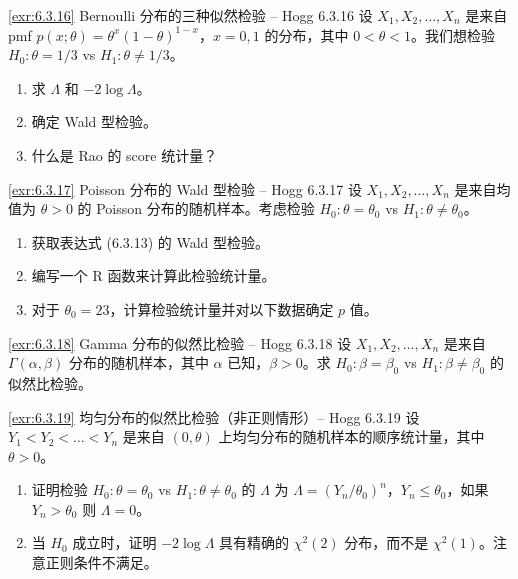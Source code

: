 \begin{exercise}{\ref{exr:6.3.16} Bernoulli 分布的三种似然检验 – Hogg 6.3.16}\label{exr:6.3.16}
设 $X_1, X_2, \ldots, X_n$ 是来自 pmf $p(x;\theta) = \theta^x(1-\theta)^{1-x}$，$x=0,1$ 的分布，其中 $0 < \theta < 1$。我们想检验 $H_0: \theta=1/3$ vs $H_1: \theta \neq 1/3$。

\begin{enumerate}
\item[(a)] 求 $\Lambda$ 和 $-2\log\Lambda$。
\item[(b)] 确定 Wald 型检验。
\item[(c)] 什么是 Rao 的 score 统计量？
\end{enumerate}
\end{exercise}

\begin{exercise}{\ref{exr:6.3.17} Poisson 分布的 Wald 型检验 – Hogg 6.3.17}\label{exr:6.3.17}
设 $X_1, X_2, \ldots, X_n$ 是来自均值为 $\theta > 0$ 的 Poisson 分布的随机样本。考虑检验 $H_0: \theta=\theta_0$ vs $H_1: \theta \neq \theta_0$。

\begin{enumerate}
\item[(a)] 获取表达式 (6.3.13) 的 Wald 型检验。
\item[(b)] 编写一个 R 函数来计算此检验统计量。
\item[(c)] 对于 $\theta_0=23$，计算检验统计量并对以下数据确定 $p$ 值。
\end{enumerate}
\end{exercise}

\begin{exercise}{\ref{exr:6.3.18} Gamma 分布的似然比检验 – Hogg 6.3.18}\label{exr:6.3.18}
设 $X_1, X_2, \ldots, X_n$ 是来自 $\Gamma(\alpha,\beta)$ 分布的随机样本，其中 $\alpha$ 已知，$\beta > 0$。求 $H_0: \beta=\beta_0$ vs $H_1: \beta \neq \beta_0$ 的似然比检验。
\end{exercise}

\begin{exercise}{\ref{exr:6.3.19} 均匀分布的似然比检验（非正则情形）– Hogg 6.3.19}\label{exr:6.3.19}
设 $Y_1 < Y_2 < \ldots < Y_n$ 是来自 $(0,\theta)$ 上均匀分布的随机样本的顺序统计量，其中 $\theta > 0$。

\begin{enumerate}
\item[(a)] 证明检验 $H_0: \theta=\theta_0$ vs $H_1: \theta \neq \theta_0$ 的 $\Lambda$ 为 $\Lambda = (Y_n/\theta_0)^n$，$Y_n \leq \theta_0$，如果 $Y_n > \theta_0$ 则 $\Lambda=0$。
\item[(b)] 当 $H_0$ 成立时，证明 $-2\log\Lambda$ 具有精确的 $\chi^2(2)$ 分布，而不是 $\chi^2(1)$。注意正则条件不满足。
\end{enumerate}
\end{exercise}

